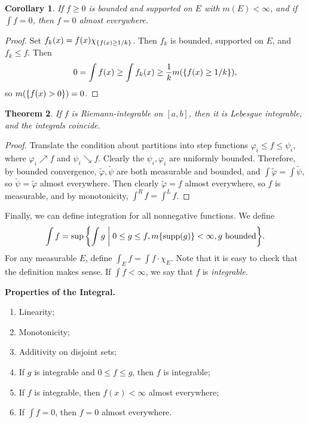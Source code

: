 \documentclass[leqno, openany]{memoir}
\newtheorem{thm}{Theorem}[chapter]
\newtheorem{cor}[thm]{Corollary}
\theoremstyle{definition}
\theoremstyle{remark}
\theoremstyle{plain}
\theoremstyle{definition}
\theoremstyle{remark}
\newcommand{\wt}[1]{\widetilde{#1}}
\DeclareMathOperator{\supp}{supp}
\begin{document}
\begin{cor}
    If $f \geq 0$ is bounded and supported on $E$ with $m(E) < \infty$, and if $\int f = 0$, then $f = 0$ almost everywhere.
\end{cor}

\begin{proof}
    Set $f_k(x) = f(x) \chi_{\qty{f(x) \geq 1/k}}$. Then $f_k$ is bounded, supported on $E$, and $f_k \leq f$. Then
    \[ 0 = \int f(x) \geq \int f_k(x) \geq \frac{1}{k} m\qty(\qty{f(x) \geq 1/k}), \]
    so $m\qty(\qty{f(x) > 0}) = 0$.
\end{proof}

\begin{thm}
    If $f$ is Riemann-integrable on $[a,b]$, then it is Lebesgue integrable, and the integrals coincide.
\end{thm}

\begin{proof}
    Translate the condition about partitions into step functions $\varphi_i \leq f \leq \psi_i$, where $\varphi_i \nearrow f$ and $\psi_i \searrow f$. Clearly the $\psi_i, \varphi_i$ are uniformly bounded. Therefore, by bounded convergence, $\wt{\varphi}, \wt{\psi}$ are both measurable and bounded, and $\int \wt{\varphi} = \int \wt{\psi}$, so $\wt{\psi} = \wt{\varphi}$ almost everywhere. Then clearly $\wt{\varphi} = f$ almost everywhere, so $f$ is measurable, and by monotonicity, $\int^R f = \int^L f$.
\end{proof}

Finally, we can define integration for all nonnegative functions. We define
\[ \int f = \sup \qty{\int g \mathrel{\bigg|} 0 \leq g \leq f, m\qty{\supp(g)}< \infty, g \text{ bounded}}. \]
For any measurable $E$, define $\int_E f = \int f \cdot \chi_E$. Note that it is easy to check that the definition makes sense. If $\int f < \infty$, we say that $f$ is \textit{integrable}.

\textbf{Properties of the Integral.}
\begin{enumerate}
    \item Linearity;
    \item Monotonicity;
    \item Additivity on disjoint sets;
    \item If $g$ is integrable and $0 \leq f \leq g$, then $f$ is integrable;
    \item If $f$ is integrable, then $f(x) < \infty$ almost everywhere;
    \item If $\int f = 0$, then $f = 0$ almost everywhere.
\end{enumerate}
\end{document}
